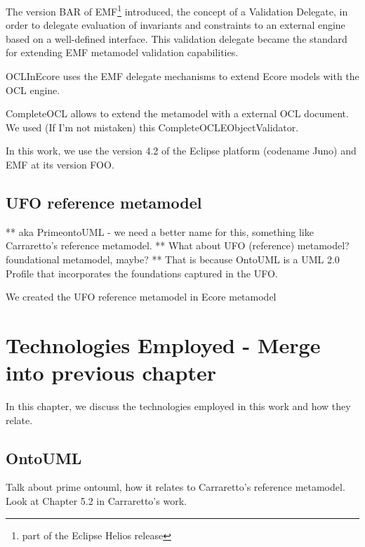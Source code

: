 \documentclass[
	10pt,				%
	oneside,
	a4paper,			%
	brazil,
	english
	]{abntex2}
\begin{document}
The version BAR of EMF\footnote{part of the Eclipse Helios release} introduced,
the concept of a Validation Delegate, in order to delegate evaluation of invariants and
constraints to an external engine based on a well-defined interface.\cite{emf_helios_nn}
This validation delegate became the standard for extending EMF metamodel validation
capabilities.


OCLInEcore uses the EMF delegate mechanisms to extend Ecore models with the OCL
engine.

CompleteOCL allows to extend the metamodel with a external OCL document.
We used (If I'm not mistaken) this CompleteOCLEObjectValidator.

In this work, we use the version 4.2 of the Eclipse platform (codename Juno) and
EMF at its version FOO.

\section{UFO reference metamodel}

** aka PrimeontoUML - we need a better name for this, something like Carraretto's reference metamodel.
** What about UFO (reference) metamodel? foundational metamodel, maybe?
** That is because OntoUML is a UML 2.0 Profile that incorporates the foundations captured in the UFO.

We created the UFO reference metamodel in Ecore metamodel


\chapter{Technologies Employed - Merge into previous chapter}

In this chapter, we discuss the technologies employed in this work and how they
relate.

\section{OntoUML}

Talk about prime ontouml, how it relates to Carraretto's reference metamodel.
Look at Chapter 5.2 in Carraretto's work.
\end{document}
